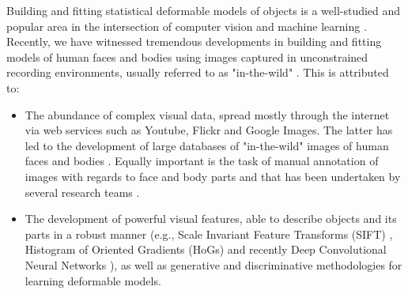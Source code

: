 Building and fitting statistical deformable models of objects is a well-studied and popular area in the intersection of computer vision and machine learning \cite{Cootes1995, Cootes2001, Matthews2004, Saragih2011, Belhumeur2011, Zhu2012, Xiong2013}. Recently, we have witnessed tremendous developments in building and fitting models of human faces and bodies using images captured in unconstrained recording environments, usually referred to as "in-the-wild" \cite{Belhumeur2011, Cao2012, Zhu2012, Xiong2013, Asthana2013, Tzimiropoulos2014, Asthana2014}. This is attributed to: 
\begin{itemize}

\item The abundance of complex visual data, spread mostly through the internet via web services such as Youtube, Flickr and Google Images. The latter has led to the development of large databases of "in-the-wild" images of human faces and bodies \cite{Belhumeur2011, Le2012, Zhu2012, Burgos2013}. Equally important is the task of manual annotation of images with regards to face and body parts and that has been undertaken by several research teams \cite{sagonas_iccv_300w_2013}.

\item The development of powerful visual features, able to describe objects and its parts in a robust manner (e.g., Scale Invariant Feature Transforms (SIFT) \cite{lowe1999object}, Histogram of Oriented Gradients (HoGs) \cite{Dalal2005} and recently Deep Convolutional Neural Networks \cite{sermanet2013overfeat}), as well as generative and discriminative methodologies for learning deformable models. 

\end{itemize}

